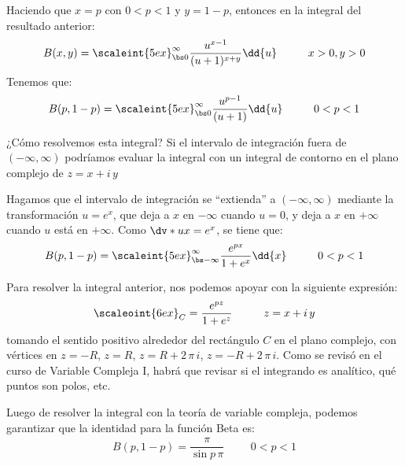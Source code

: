 Haciendo que  $x = p$ con $0 < p < 1$  y $y = 1 - p$, entonces en la integral del resultado anterior:
\begin{align*}
B(x, y) = \scaleint{5ex}_{\bs 0}^{\infty} \dfrac{u^{x-1}}{(u + 1)^{x+y}} \dd{u} \hspace{1cm} x > 0, y > 0
\end{align*}
Tenemos que:
\begin{align*}
B(p, 1 - p) = \scaleint{5ex}_{\bs 0}^{\infty} \dfrac{u^{p-1}}{(u + 1)} \dd{u} \hspace{1cm} 0 < p < 1
\end{align*}

¿Cómo resolvemos esta integral? Si el intervalo de integración fuera de $(-\infty, \infty)$ podríamos evaluar la integral con un integral de contorno en el plano complejo de $z = x +  i \, y$ 
\par
Hagamos que el intervalo de integración se \enquote{extienda} a $(-\infty, \infty)$  mediante la transformación $u = e^{x}$, que deja a $x$ en $-\infty$ cuando $u = 0$, y deja a $x$ en $+\infty$ cuando $u$ está en $+\infty$. Como $\dv*{u}{x} = e^{x}$, se tiene que:
\begin{align*}
B(p, 1 - p) = \scaleint{5ex}_{\bs -\infty}^{\infty} \dfrac{e^{px}}{1 + e^{x}} \dd{x} \hspace{1cm} 0 < p < 1
\end{align*}

Para resolver la integral anterior, nos podemos apoyar con la siguiente expresión:
\begin{align*}
\scaleoint{6ex}_{C} = \dfrac{e^{pz}}{1 + e^{z}} \hspace{1cm} z = x + i \, y
\end{align*}
tomando el sentido positivo alrededor del rectángulo $C$ en el plano complejo, con vértices en $z = -R$, $z = R$, $z = R + 2 \,  \pi \, i$, $z = -R +  2 \, \pi \, i$. Como se revisó en el curso de Variable Compleja I, habrá que revisar si el integrando es analítico, qué puntos son polos, etc.
\par
Luego de resolver la integral con la teoría de variable compleja, podemos garantizar que la identidad para la función Beta es:
\begin{align*}
B(p, 1 - p) = \dfrac{\pi}{\sin p \, \pi} \hspace{1cm} 0 < p < 1
\end{align*}



